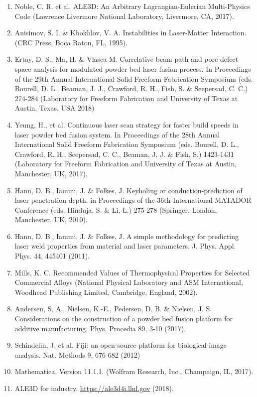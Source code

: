 \documentclass[10pt]{article}
\begin{document}
\begin{enumerate}
  \item Noble, C. R. et al. ALE3D: An Arbitrary Lagrangian-Eulerian Multi-Physics Code (Lawrence Livermore National Laboratory, Livermore, CA, 2017).

  \item Anisimov, S. I. \& Khokhlov, V. A. Instabilities in Laser-Matter Interaction. (CRC Press, Boca Raton, FL, 1995).

  \item Ertay, D. S., Ma, H. \& Vlasea M. Correlative beam path and pore defect space analysis for modulated powder bed laser fusion process. In Proceedings of the 29th Annual International Solid Freeform Fabrication Symposium (eds. Bourell, D. L., Beaman, J. J., Crawford, R. H., Fish, S. \& Seepersad, C. C.) 274-284 (Laboratory for Freeform Fabrication and University of Texas at Austin, Texas, USA 2018)

  \item Yeung, H., et al. Continuous laser scan strategy for faster build speeds in laser powder bed fusion system. In Proceedings of the 28th Annual International Solid Freeform Fabrication Symposium (eds. Bourell, D. L., Crawford, R. H., Seepersad, C. C., Beaman, J. J. \& Fish, S.) 1423-1431 (Laboratory for Freeform Fabrication and University of Texas at Austin, Manchester, UK, 2017).

  \item Hann, D. B., Iammi, J. \& Folkes, J. Keyholing or conduction-prediction of laser penetration depth. in Proceedings of the 36th International MATADOR Conference (eds. Hinduja, S. \& Li, L.) 275-278 (Springer, London, Manchester, UK, 2010).

  \item Hann, D. B., Iammi, J. \& Folkes, J. A simple methodology for predicting laser weld properties from material and laser parameters. J. Phys. Appl. Phys. 44, 445401 (2011).

  \item Mills, K. C. Recommended Values of Thermophysical Properties for Selected Commercial Alloys (National Physical Laboratory and ASM International, Woodhead Publishing Limited, Cambridge, England, 2002).

  \item Andersen, S. A., Nielsen, K.-E., Pedersen, D. B. \& Nielsen, J. S. Considerations on the construction of a powder bed fusion platform for additive manufacturing. Phys. Procedia 89, 3-10 (2017).

  \item Schindelin, J. et al. Fiji: an open-source platform for biological-image analysis. Nat. Methods 9, 676-682 (2012)

  \item Mathematica. Version 11.1.1. (Wolfram Research, Inc., Champaign, IL, 2017).

  \item ALE3D for industry. \href{https://ale3d4i.llnl.gov}{https://ale3d4i.llnl.gov} (2018).

\end{enumerate}
\end{document}
